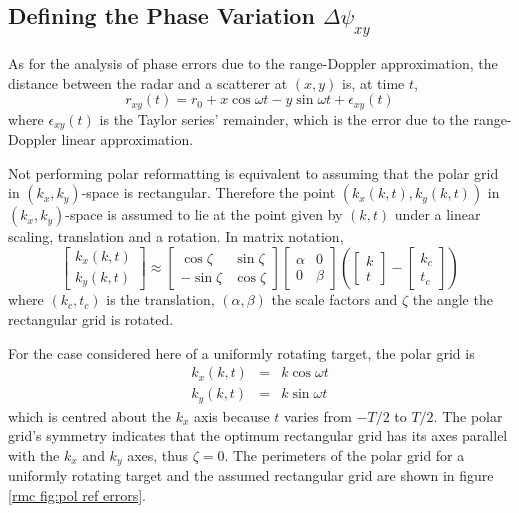 \subsection{Defining the Phase Variation $\Delta\psi_{xy}$}

As for the analysis of phase errors due to the range-Doppler approximation,
the distance between the radar and a scatterer at $(x,y)$ is, at time $t$,
\begin{equation}
r_{xy}(t)=r_0+x\cos\omega t-y\sin\omega t+\epsilon_{xy}(t)
\end{equation}
where $\epsilon_{xy}(t)$ is the Taylor series' remainder, which is the error
due to the range-Doppler linear approximation.

Not performing polar reformatting is equivalent to assuming that the polar
grid in $(k_x,k_y)$-space is rectangular.  Therefore the point
$(k_x(k,t),k_y(k,t))$ in $(k_x,k_y)$-space is assumed to lie at
the point given by $(k,t)$ under a linear scaling, translation and a
rotation.  In matrix notation, 
\begin{equation}
\left[\begin{array}{c} k_x(k,t) \\ k_y(k,t) \end{array}\right]
\approx 
\left[\begin{array}{cc} \cos\zeta & \sin\zeta \\
 -\sin\zeta& \cos\zeta \end{array}\right]
\left[\begin{array}{cc} \alpha & 0 \\ 0 & \beta \end{array}\right]
\left(
\left[\begin{array}{c} k \\ t\end{array}\right]
-\left[\begin{array}{c} k_c \\ t_c\end{array}\right]
\right)
\end{equation}
where $(k_c,t_c)$ is the translation, $(\alpha,\beta)$ the scale factors and
$\zeta$ the angle the rectangular grid is rotated.

For the case considered here of a uniformly rotating target, the polar grid
is
\begin{eqnarray}
k_x(k,t)&=&k\cos\omega t \\
k_y(k,t)&=&k\sin\omega t
\end{eqnarray}
which is centred about the $k_x$ axis because $t$ varies from $-T/2$ to
$T/2$.  The polar grid's symmetry indicates that the optimum rectangular 
grid has its axes parallel with the $k_x$ and $k_y$ axes, thus $\zeta=0$.
The perimeters of the polar grid for a uniformly rotating target and the
assumed rectangular grid are shown in figure \ref{rmc fig:pol ref errors}.  

